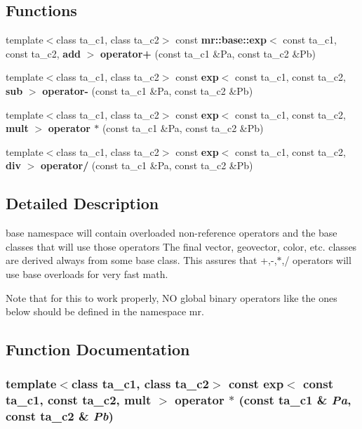 \subsection*{Functions}
\begin{CompactItemize}
\item 
template$<$class ta\_\-c1, class ta\_\-c2$>$ const {\bf mr::base::exp}$<$ const ta\_\-c1, const ta\_\-c2, {\bf add} $>$ {\bf operator+} (const ta\_\-c1 \&Pa, const ta\_\-c2 \&Pb)
\item 
template$<$class ta\_\-c1, class ta\_\-c2$>$ const {\bf exp}$<$ const ta\_\-c1, const ta\_\-c2, {\bf sub} $>$ {\bf operator-} (const ta\_\-c1 \&Pa, const ta\_\-c2 \&Pb)
\item 
template$<$class ta\_\-c1, class ta\_\-c2$>$ const {\bf exp}$<$ const ta\_\-c1, const ta\_\-c2, {\bf mult} $>$ {\bf operator $\ast$} (const ta\_\-c1 \&Pa, const ta\_\-c2 \&Pb)
\item 
template$<$class ta\_\-c1, class ta\_\-c2$>$ const {\bf exp}$<$ const ta\_\-c1, const ta\_\-c2, {\bf div} $>$ {\bf operator/} (const ta\_\-c1 \&Pa, const ta\_\-c2 \&Pb)
\end{CompactItemize}


\subsection{Detailed Description}
base namespace will contain overloaded non-reference operators and the base classes that will use those operators The final vector, geovector, color, etc. classes are derived always from some base class. This assures that +,-,$\ast$,/ operators will use base overloads for very fast math.

Note that for this to work properly, NO global binary operators like the ones below should be defined in the namespace mr. 



\subsection{Function Documentation}
\subsubsection{\setlength{\rightskip}{0pt plus 5cm}template$<$class ta\_\-c1, class ta\_\-c2$>$ const {\bf exp}$<$ const ta\_\-c1, const ta\_\-c2, {\bf mult} $>$ operator $\ast$ (const ta\_\-c1 \& {\em Pa}, const ta\_\-c2 \& {\em Pb})\hspace{0.3cm}{\tt  [inline]}}\label{namespacemr_1_1base_a2}


